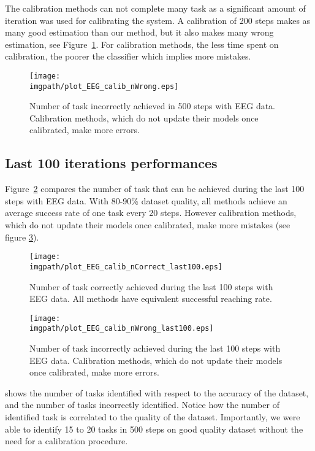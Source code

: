 The calibration methods can not complete many task as a significant amount of iteration was used for calibrating the system. A calibration of 200 steps makes as many good estimation than our method, but it also makes many wrong estimation, see Figure~\ref{fig:nWrongEEG}. For calibration methods, the less time spent on calibration, the poorer the classifier which implies more mistakes.

\begin{figure}[!ht]
\centering
\texttt{[image: \\imgpath/plot\_EEG\_calib\_nWrong.eps]}
\caption{Number of task incorrectly achieved in 500 steps with EEG data. Calibration methods, which do not update their models once calibrated, make more errors.}
\label{fig:nWrongEEG}
\end{figure}

\subsection{Last 100 iterations performances}

Figure~\ref{fig:nCorrectEEG_last100} compares the number of task that can be achieved during the last 100 steps with EEG data. With 80-90\% dataset quality, all methods achieve an average success rate of one task every 20 steps. However calibration methods, which do not update their models once calibrated, make more mistakes (see figure \ref{fig:nWrongEEG_last100}).

\begin{figure}[!ht]
\centering
\texttt{[image: \\imgpath/plot\_EEG\_calib\_nCorrect\_last100.eps]}
\caption{Number of task correctly achieved during the last 100 steps with EEG data. All methods have equivalent successful reaching rate.}
\label{fig:nCorrectEEG_last100}
\end{figure} 

\begin{figure}[!ht]
\centering
\texttt{[image: \\imgpath/plot\_EEG\_calib\_nWrong\_last100.eps]}
\caption{Number of task incorrectly achieved during the last 100 steps with EEG data. Calibration methods, which do not update their models once calibrated, make more errors.}
\label{fig:nWrongEEG_last100}
\end{figure} 

shows the number of tasks identified with respect to the accuracy of the dataset, and the number of tasks incorrectly identified. Notice how the number of identified task is correlated to the quality of the dataset. Importantly, we were able to identify 15 to 20 tasks in 500 steps on good quality dataset without the need for a calibration procedure.


